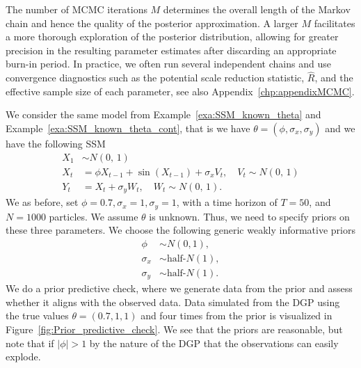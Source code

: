 The number of MCMC iterations \(M\) determines the overall length of the Markov chain and hence the quality of the posterior approximation. A larger \(M\) facilitates a more thorough exploration of the posterior distribution, allowing for greater precision in the resulting parameter estimates after discarding an appropriate burn-in period. In practice, we often run several independent chains and use convergence diagnostics such as the potential scale reduction statistic, \(\hat{R}\), and the effective sample size of each parameter, see also Appendix~\ref{chp:appendixMCMC}. 


\begin{example}
	\label{exa:SSM_unknown_theta}
	We consider the same model from Example~\ref{exa:SSM_known_theta} and Example~\ref{exa:SSM_known_theta_cont}, that is we have $\theta=(\phi, \sigma_x, \sigma_y)$ and we have the following \gls*{SSM}
	\begin{align*}
		X_1 &\sim N(0,\, 1) \\
		X_t&=\phi X_{t-1}+\sin(X_{t-1})+\sigma_x V_t, \quad V_t \sim N(0, \, 1) \\
		Y_t&=X_t+\sigma_y W_t, \quad W_t \sim N(0, \, 1).
	\end{align*}
	We as before, set $\phi=0.7, \sigma_x=1, \sigma_y=1$, with a time horizon of $T=50$, and $N=1000$ particles. We assume $\theta$ is unknown. Thus, we need to specify priors on these three parameters. We choose the following generic weakly informative priors
	\begin{align*}
		\phi &\sim N(0,1), \\
		\sigma_x &\sim \text{half-}N(1), \\
		\sigma_y &\sim \text{half-}N(1).
	\end{align*}
	We do a prior predictive check, where we generate data from the prior and assess whether it aligns with the observed data. Data simulated from the \gls*{DGP} using the true values $\theta=(0.7, 1, 1)$ and four times from the prior is visualized in Figure~\ref{fig:Prior_predictive_check}. We see that the priors are reasonable, but note that if $\lvert \phi \rvert>1$ by the nature of the \gls*{DGP} that the observations can easily explode.  
	

\end{example}
